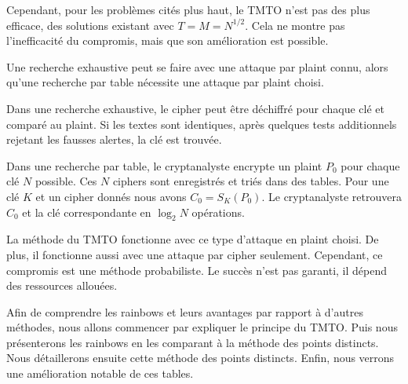 		\bigskip

		Cependant, pour les problèmes cités plus haut, le \gls{TMTO} n'est pas des plus efficace, des solutions existant avec $T = M = N^{1/2}$. Cela ne montre pas l'inefficacité du compromis, mais que son amélioration est possible.

		\bigskip

		Une recherche exhaustive peut se faire avec une attaque par \gls{plaint} connu, alors qu'une recherche par table nécessite une attaque par \gls{plaint} choisi.

		\bigskip

		Dans une recherche exhaustive, le \gls{cipher} peut être déchiffré pour chaque clé et comparé au \gls{plaint}. Si les textes sont identiques, après quelques tests additionnels rejetant les fausses alertes, la clé est trouvée.

		\bigskip

		Dans une recherche par table, le cryptanalyste encrypte un \gls{plaint} $P_0$ pour chaque clé $N$ possible. Ces $N$ \glspl{cipher} sont enregistrés et triés dans des tables. Pour une clé $K$ et un \gls{cipher} donnés nous avons $C_0 = S_K(P_0)$. Le cryptanalyste retrouvera $C_0$ et la clé correspondante en $\log_2 N$ opérations.

		\bigskip

		La méthode du \gls{TMTO} fonctionne avec ce type d'attaque en \gls{plaint} choisi. De plus, il fonctionne aussi avec une attaque par \gls{cipher} seulement. Cependant, ce compromis est une méthode probabiliste. Le succès n'est pas garanti, il dépend des ressources allouées.

		\bigskip

		Afin de comprendre les \glspl{rainbow} et leurs avantages par rapport à d'autres méthodes, nous allons commencer par expliquer le principe du \gls{TMTO}. Puis nous présenterons les \glspl{rainbow} en les comparant à la méthode des points distincts. Nous détaillerons ensuite cette méthode des points distincts. Enfin, nous verrons une amélioration notable de ces tables.

\endinput{}
